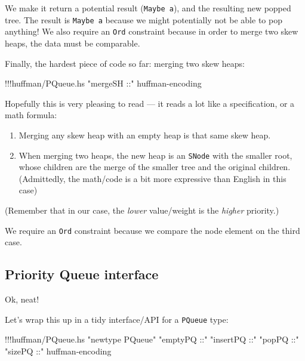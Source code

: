 \documentclass[]{article}
\newenvironment{Shaded}{}{}
\newcommand{\StringTok}[1]{\textcolor[rgb]{0.25,0.44,0.63}{{#1}}}
\newcommand{\FunctionTok}[1]{\textcolor[rgb]{0.02,0.16,0.49}{{#1}}}
\newcommand{\NormalTok}[1]{{#1}}
\begin{document}
We make it return a potential result (\texttt{Maybe\ a}), and the
resulting new popped tree. The result is \texttt{Maybe\ a} because we
might potentially not be able to pop anything! We also require an
\texttt{Ord} constraint because in order to merge two skew heaps, the
data must be comparable.

Finally, the hardest piece of code so far: merging two skew heaps:

\begin{Shaded}
\begin{Highlighting}[]
\FunctionTok{!!!}\NormalTok{huffman}\FunctionTok{/}\NormalTok{PQueue.hs }\StringTok{"mergeSH ::"} \NormalTok{huffman}\FunctionTok{-}\NormalTok{encoding}
\end{Highlighting}
\end{Shaded}

Hopefully this is very pleasing to read --- it reads a lot like a
specification, or a math formula:

\begin{enumerate}
\def\labelenumi{\arabic{enumi}.}
\tightlist
\item
  Merging any skew heap with an empty heap is that same skew heap.
\item
  When merging two heaps, the new heap is an \texttt{SNode} with the
  smaller root, whose children are the merge of the smaller tree and the
  original children. (Admittedly, the math/code is a bit more expressive
  than English in this case)
\end{enumerate}

(Remember that in our case, the \emph{lower} value/weight is the
\emph{higher} priority.)

We require an \texttt{Ord} constraint because we compare the node
element on the third case.

\subsection{Priority Queue interface}\label{priority-queue-interface}

Ok, neat!

Let's wrap this up in a tidy interface/API for a \texttt{PQueue} type:

\begin{Shaded}
\begin{Highlighting}[]
\FunctionTok{!!!}\NormalTok{huffman}\FunctionTok{/}\NormalTok{PQueue.hs }\StringTok{"newtype PQueue"} \StringTok{"emptyPQ ::"} \StringTok{"insertPQ ::"} \StringTok{"popPQ ::"} \StringTok{"sizePQ ::"} \NormalTok{huffman}\FunctionTok{-}\NormalTok{encoding}
\end{Highlighting}
\end{Shaded}
\end{document}

